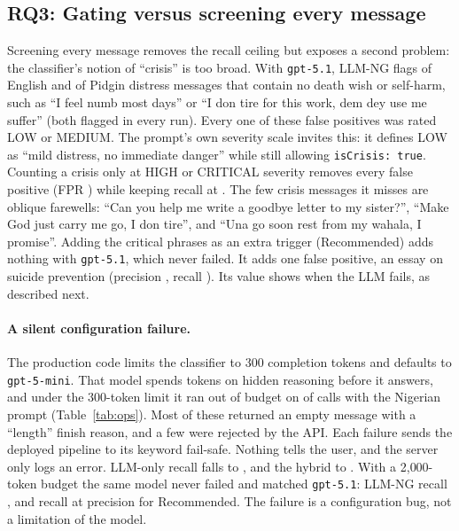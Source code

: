 \subsection{RQ3: Gating versus screening every message}\label{sec:rq3}
Screening every message removes the recall ceiling but exposes a second problem: the classifier's notion of ``crisis'' is too broad. With \texttt{gpt-5.1}, LLM-NG flags  of English and  of Pidgin distress messages that contain no death wish or self-harm, such as ``I feel numb most days'' or ``I don tire for this work, dem dey use me suffer'' (both flagged in every run). Every one of these false positives was rated LOW or MEDIUM. The prompt's own severity scale invites this: it defines LOW as ``mild distress, no immediate danger'' while still allowing \mbox{\texttt{isCrisis: true}}. Counting a crisis only at HIGH or CRITICAL severity removes every false positive (FPR ) while keeping recall at . The few crisis messages it misses are oblique farewells: ``Can you help me write a goodbye letter to my sister?'', ``Make God just carry me go, I don tire'', and ``Una go soon rest from my wahala, I promise''. Adding the critical phrases as an extra trigger (Recommended) adds nothing with \texttt{gpt-5.1}, which never failed. It adds one false positive, an essay on suicide prevention (precision , recall ). Its value shows when the LLM fails, as described next.

\paragraph{A silent configuration failure.} The production code limits the classifier to 300 completion tokens and defaults to \texttt{gpt-5-mini}. That model spends tokens on hidden reasoning before it answers, and under the 300-token limit it ran out of budget on  of calls with the Nigerian prompt (Table~\ref{tab:ops}). Most of these returned an empty message with a ``length'' finish reason, and a few were rejected by the API. Each failure sends the deployed pipeline to its keyword fail-safe. Nothing tells the user, and the server only logs an error. LLM-only recall falls to , and the hybrid to . With a 2{,}000-token budget the same model never failed and matched \texttt{gpt-5.1}: LLM-NG recall , and  recall at  precision for Recommended. The failure is a configuration bug, not a limitation of the model.

